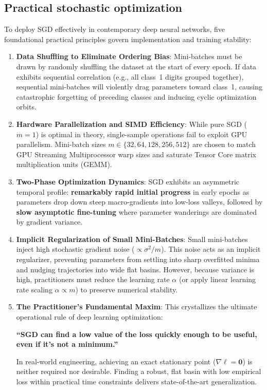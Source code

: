 \subsection{Practical stochastic optimization}
\label{sec:practical_sgd_deep_learning}

To deploy SGD effectively in contemporary deep neural networks, five foundational practical principles govern implementation and training stability:

\begin{enumerate}
  \item \textbf{Data Shuffling to Eliminate Ordering Bias}:
    Mini-batches must be drawn by randomly shuffling the dataset at the start of every epoch. If data exhibits sequential correlation (e.g., all class~1 digits grouped together), sequential mini-batches will violently drag parameters toward class~1, causing catastrophic forgetting of preceding classes and inducing cyclic optimization orbits.
  \item \textbf{Hardware Parallelization and SIMD Efficiency}:
    While pure SGD ($m = 1$) is optimal in theory, single-sample operations fail to exploit GPU parallelism. Mini-batch sizes $m \in \{32, 64, 128, 256, 512\}$ are chosen to match GPU Streaming Multiprocessor warp sizes and saturate Tensor Core matrix multiplication units (GEMM).
  \item \textbf{Two-Phase Optimization Dynamics}:
    SGD exhibits an asymmetric temporal profile: \textbf{remarkably rapid initial progress} in early epochs as parameters drop down steep macro-gradients into low-loss valleys, followed by \textbf{slow asymptotic fine-tuning} where parameter wanderings are dominated by gradient variance.
  \item \textbf{Implicit Regularization of Small Mini-Batches}:
    Small mini-batches inject high stochastic gradient noise ($\propto \sigma^2 / m$). This noise acts as an implicit regularizer, preventing parameters from settling into sharp overfitted minima and nudging trajectories into wide flat basins. However, because variance is high, practitioners must reduce the learning rate $\alpha$ (or apply linear learning rate scaling $\alpha \propto m$) to preserve numerical stability.
  \item \textbf{The Practitioner's Fundamental Maxim}:
    This crystallizes the ultimate operational rule of deep learning optimization:
    \begin{center}
    \textbf{\large\color{politoNavy} ``SGD can find a low value of the loss quickly enough to be useful, even if it's not a minimum.''}
    \end{center}
    In real-world engineering, achieving an exact stationary point ($\nabla \ell = \mathbf{0}$) is neither required nor desirable. Finding a robust, flat basin with low empirical loss within practical time constraints delivers state-of-the-art generalization.
\end{enumerate}
